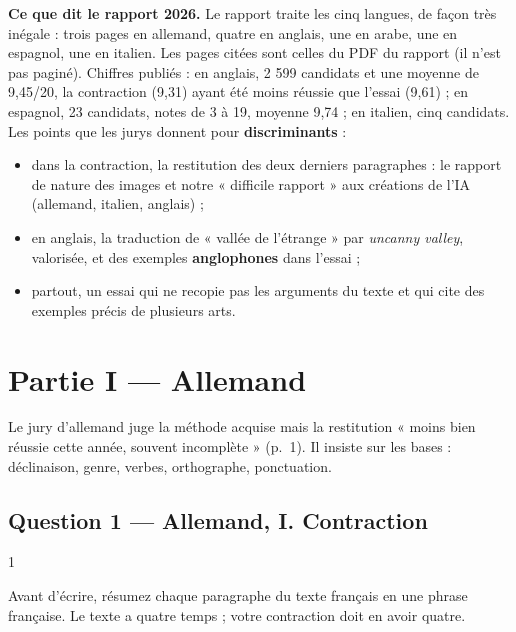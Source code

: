 \documentclass[11pt,a4paper]{article}
\providecommand{\tightlist}{\setlength{\itemsep}{0pt}\setlength{\parskip}{0pt}}
\begin{document}
\textbf{Ce que dit le rapport 2026.} Le rapport traite les cinq langues, de façon très inégale : trois pages en allemand, quatre en anglais, une en arabe, une en espagnol, une en italien. Les pages citées sont celles du PDF du rapport (il n'est pas paginé). Chiffres publiés : en anglais, 2 599 candidats et une moyenne de 9,45/20, la contraction (9,31) ayant été moins réussie que l'essai (9,61) ; en espagnol, 23 candidats, notes de 3 à 19, moyenne 9,74 ; en italien, cinq candidats. Les points que les jurys donnent pour \textbf{discriminants} :

\begin{itemize}
\tightlist
\item
  dans la contraction, la restitution des deux derniers paragraphes : le rapport de nature des images et notre « difficile rapport » aux créations de l'IA (allemand, italien, anglais) ;
\item
  en anglais, la traduction de « vallée de l'étrange » par \emph{uncanny valley}, valorisée, et des exemples \textbf{anglophones} dans l'essai ;
\item
  partout, un essai qui ne recopie pas les arguments du texte et qui cite des exemples précis de plusieurs arts.
\end{itemize}

\hypertarget{partie-i-allemand}{%
\section{Partie I --- Allemand}\label{partie-i-allemand}}

Le jury d'allemand juge la méthode acquise mais la restitution « moins bien réussie cette année, souvent incomplète » (p.~1). Il insiste sur les bases : déclinaison, genre, verbes, orthographe, ponctuation.

\hypertarget{question-1-allemand-i.-contraction}{%
\subsection{Question 1 --- Allemand, I. Contraction}\label{question-1-allemand-i.-contraction}}

\begin{indication}{1}

Avant d'écrire, résumez chaque paragraphe du texte français en une phrase française. Le texte a quatre temps ; votre contraction doit en avoir quatre.

\end{indication}
\end{document}
